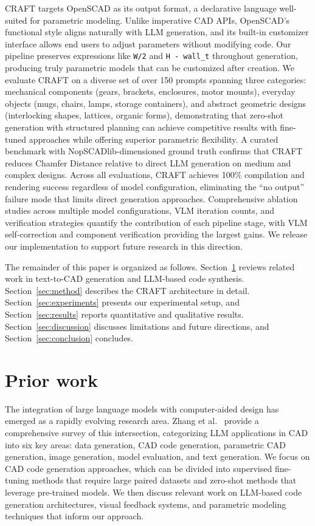 \documentclass[5p,twocolumn,10pt,times]{elsarticle}
\begin{document}
CRAFT targets OpenSCAD as its output format, a declarative language well-suited for parametric modeling. Unlike imperative CAD APIs, OpenSCAD's functional style aligns naturally with LLM generation, and its built-in customizer interface allows end users to adjust parameters without modifying code. Our pipeline preserves expressions like \texttt{W/2} and \texttt{H - wall\_t} throughout generation, producing truly parametric models that can be customized after creation. We evaluate CRAFT on a diverse set of over 150 prompts spanning three categories: mechanical components (gears, brackets, enclosures, motor mounts), everyday objects (mugs, chairs, lamps, storage containers), and abstract geometric designs (interlocking shapes, lattices, organic forms), demonstrating that zero-shot generation with structured planning can achieve competitive results with fine-tuned approaches while offering superior parametric flexibility. A curated benchmark with NopSCADlib-dimensioned ground truth confirms that CRAFT reduces Chamfer Distance relative to direct LLM generation on medium and complex designs. Across all evaluations, CRAFT achieves 100\% compilation and rendering success regardless of model configuration, eliminating the ``no output'' failure mode that limits direct generation approaches. Comprehensive ablation studies across multiple model configurations, VLM iteration counts, and verification strategies quantify the contribution of each pipeline stage, with VLM self-correction and component verification providing the largest gains. We release our implementation to support future research in this direction.

The remainder of this paper is organized as follows. Section~\ref{sec:related} reviews related work in text-to-CAD generation and LLM-based code synthesis. Section~\ref{sec:method} describes the CRAFT architecture in detail. Section~\ref{sec:experiments} presents our experimental setup, and Section~\ref{sec:results} reports quantitative and qualitative results. Section~\ref{sec:discussion} discusses limitations and future directions, and Section~\ref{sec:conclusion} concludes.

\section{Prior work}
\label{sec:related}

The integration of large language models with computer-aided design has emerged as a rapidly evolving research area. Zhang et al.~\cite{zhang2026llmcad} provide a comprehensive survey of this intersection, categorizing LLM applications in CAD into six key areas: data generation, CAD code generation, parametric CAD generation, image generation, model evaluation, and text generation. We focus on CAD code generation approaches, which can be divided into supervised fine-tuning methods that require large paired datasets and zero-shot methods that leverage pre-trained models. We then discuss relevant work on LLM-based code generation architectures, visual feedback systems, and parametric modeling techniques that inform our approach.
\end{document}
